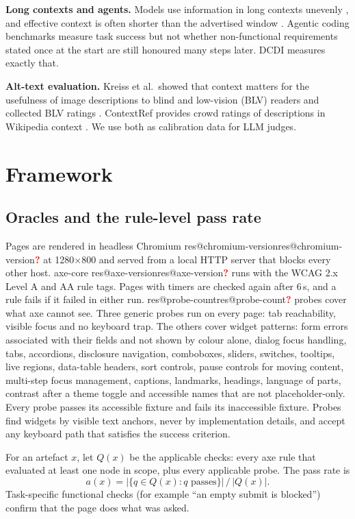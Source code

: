 \documentclass[conference]{IEEEtran}
\makeatletter
\newcommand{\res}[1]{\ifcsname res@#1\endcsname\csname res@#1\endcsname\else\pending{#1}\fi}
\newcommand{\pending}[1]{\textcolor{red}{\textbf{?}}}
\makeatother
\begin{document}
\textbf{Long contexts and agents.} Models use information in long contexts unevenly
\cite{liu2024lost}, and effective context is often shorter than the advertised window
\cite{hsieh2024ruler}. Agentic coding benchmarks measure task success \cite{jimenez2024swebench}
but not whether non-functional requirements stated once at the start are still honoured many
steps later. DCDI measures exactly that.

\textbf{Alt-text evaluation.} Kreiss et al.\ showed that context matters for the usefulness
of image descriptions to blind and low-vision (BLV) readers and collected BLV ratings
\cite{kreiss2022context}. ContextRef provides crowd ratings of descriptions in Wikipedia
context \cite{kreiss2024contextref}. We use both as calibration data for LLM judges.

\section{Framework}

\subsection{Oracles and the rule-level pass rate}
Pages are rendered in headless Chromium \res{chromium-version} at 1280$\times$800 and served from
a local HTTP server that blocks every other host. axe-core \res{axe-version} runs with the WCAG
2.x Level A and AA rule tags. Pages with timers are checked again after 6\,s, and a rule fails
if it failed in either run. \res{probe-count} probes cover what axe cannot see. Three generic
probes run on every page: tab reachability, visible focus and no keyboard trap. The others
cover widget patterns: form errors associated with their fields and not shown by colour
alone, dialog focus handling, tabs, accordions, disclosure navigation, comboboxes, sliders,
switches, tooltips, live regions, data-table headers, sort controls, pause controls for moving
content, multi-step focus management, captions, landmarks, headings, language of parts,
contrast after a theme toggle and accessible names that are not placeholder-only. Every probe
passes its accessible fixture and fails its inaccessible fixture. Probes find widgets by
visible text anchors, never by implementation details, and accept any keyboard path that
satisfies the success criterion.

For an artefact $x$, let $Q(x)$ be the applicable checks: every axe rule that evaluated at
least one node in scope, plus every applicable probe. The pass rate is
\begin{equation}
a(x) = |\{q\in Q(x) : q \text{ passes}\}| \,/\, |Q(x)| .
\end{equation}
Task-specific functional checks (for example ``an empty submit is blocked'') confirm that the
page does what was asked.
\end{document}

